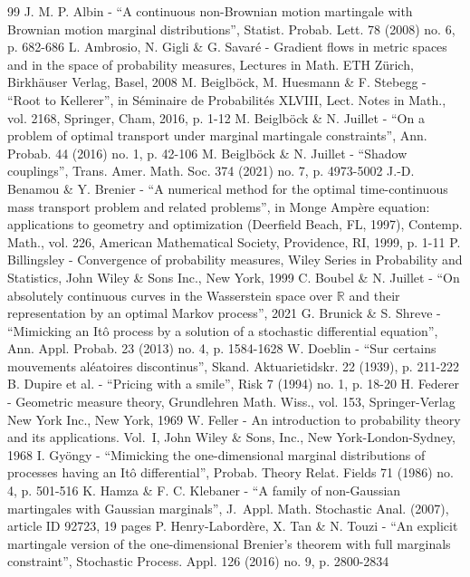 \documentclass[10pt,a4paper]{article}
\theoremstyle{plain}
\theoremstyle{definition}
\begin{document}
\begin{thebibliography}{99}
 J. M. P. Albin - “A continuous non-Brownian motion martingale with Brownian motion marginal distributions”, Statist. Probab. Lett. 78 (2008) no. 6, p. 682-686
 L. Ambrosio, N. Gigli \& G. Savaré - Gradient flows in metric spaces and in the space of probability measures, Lectures in Math. ETH Zürich, Birkhäuser Verlag, Basel, 2008
 M. Beiglböck, M. Huesmann \& F. Stebegg - “Root to Kellerer”, in Séminaire de Probabilités XLVIII, Lect. Notes in Math., vol. 2168, Springer, Cham, 2016, p. 1-12
 M. Beiglböck \& N. Juillet - “On a problem of optimal transport under marginal martingale constraints”, Ann. Probab. 44 (2016) no. 1, p. 42-106
 M. Beiglböck \& N. Juillet - “Shadow couplings”, Trans. Amer. Math. Soc. 374 (2021) no. 7, p. 4973-5002
 J.-D. Benamou \& Y. Brenier - “A numerical method for the optimal time-continuous mass transport problem and related problems”, in Monge Ampère equation: applications to geometry and optimization (Deerfield Beach, FL, 1997), Contemp. Math., vol. 226, American Mathematical Society, Providence, RI, 1999, p. 1-11
 P. Billingsley - Convergence of probability measures, Wiley Series in Probability and Statistics, John Wiley \& Sons Inc., New York, 1999
 C. Boubel \& N. Juillet - “On absolutely continuous curves in the Wasserstein space over \ensuremath{\mathbb{R}} and their representation by an optimal Markov process”, 2021
 G. Brunick \& S. Shreve - “Mimicking an Itô process by a solution of a stochastic differential equation”, Ann. Appl. Probab. 23 (2013) no. 4, p. 1584-1628
 W. Doeblin - “Sur certains mouvements aléatoires discontinus”, Skand. Aktuarietidskr. 22 (1939), p. 211-222
 B. Dupire et al. - “Pricing with a smile”, Risk 7 (1994) no. 1, p. 18-20
 H. Federer - Geometric measure theory, Grundlehren Math. Wiss., vol. 153, Springer-Verlag New York Inc., New York, 1969
 W. Feller - An introduction to probability theory and its applications. Vol. I, John Wiley \& Sons, Inc., New York-London-Sydney, 1968
 I. Gyöngy - “Mimicking the one-dimensional marginal distributions of processes having an Itô differential”, Probab. Theory Relat. Fields 71 (1986) no. 4, p. 501-516
 K. Hamza \& F. C. Klebaner - “A family of non-Gaussian martingales with Gaussian marginals”, J. Appl. Math. Stochastic Anal. (2007), article ID 92723, 19 pages
 P. Henry-Labordère, X. Tan \& N. Touzi - “An explicit martingale version of the one-dimensional Brenier’s theorem with full marginals constraint”, Stochastic Process. Appl. 126 (2016) no. 9, p. 2800-2834

\end{thebibliography}
\end{document}
